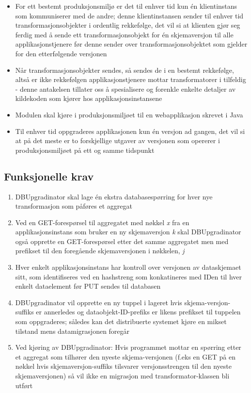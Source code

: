 \begin{itemize}
  \item For ett bestemt produksjonsmiljø er det til enhver tid kun én klientinstans som kommuniserer med de andre; denne klientinstansen sender til enhver tid transformasjonsobjekter i ordentlig rekkefølge, det vil si at klienten gjør seg ferdig med å sende ett transformasjonsobjekt for én skjemaversjon til alle applikasjonstjenere før denne sender over transformasjonsobjektet som gjelder for den etterfølgende versjonen
  \item Når transformasjonsobjekter sendes, så sendes de i en bestemt rekkefølge, altså er ikke rekkefølgen applikasjonstjenere mottar transformatorer i tilfeldig - denne antakelsen tillater oss å spesialisere og forenkle enkelte detaljer av kildekoden som kjører hos applikasjonsinstansene
  \item Modulen skal kjøre i produksjonsmiljøet til en webapplikasjon skrevet i Java
  \item Til enhver tid oppgraderes applikasjonen kun én versjon ad gangen, det vil si at på det meste er to forskjellige utgaver av versjonen som opererer i produksjonsmiljøet på ett og samme tidspunkt
\end{itemize}

\subsection{Funksjonelle krav}

\begin{enumerate}
  \item DBUpgradinator skal lage én ekstra databasespørring for hver nye transformasjon som påføres et aggregat
  \item Ved en GET-forespørsel til aggregatet med nøkkel \emph{x} fra en applikasjonsinstans som bruker en ny skjemaversjon \emph{k} skal DBUpgradinator også opprette en GET-forespørsel etter det samme aggregatet men med prefikset til den foregående skjemaversjonen i nøkkelen, \emph{j}
  \item Hver enkelt applikasjonsinstans har kontroll over versjonen av dataskjemaet sitt, som identifiseres ved en hashstreng som konkatineres med IDen til hver enkelt dataelement før PUT sendes til databasen
  \item DBUpgradinator vil opprette en ny tuppel i lageret hvis skjema-versjon-suffiks er annerledes og dataobjekt-ID-prefiks er likens prefikset til tuppelen som oppgraderes; således kan det distribuerte systemet kjøre en mikset tilstand mens datamigrasjonen foregår
  \item Ved kjøring av DBUpgradinator: Hvis programmet mottar en spørring etter et aggregat som tilhører den nyeste skjema-versjonen (f.eks en GET på en nøkkel hvis skjemaversjon-suffiks tilsvarer versjonsstrengen til den nyeste skjemaversjonen) så vil ikke en migrasjon med transformator-klassen bli utført
\end{enumerate}

